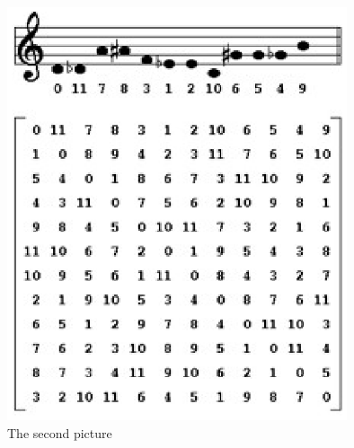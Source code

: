 \begin{figure} %
  \centering
  \includegraphics[width=10cm]{figures/Matrix}
  \caption{The second picture}
  \label{fig:xfig1}
\end{figure}


